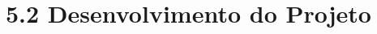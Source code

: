 \hypertarget{__RefHeading___Toc4831_3118176633}{}
\hypertarget{_Toc4562714612}{}
\section*{5.2 Desenvolvimento do Projeto}
\label{ages-iv:text-h-0107}
